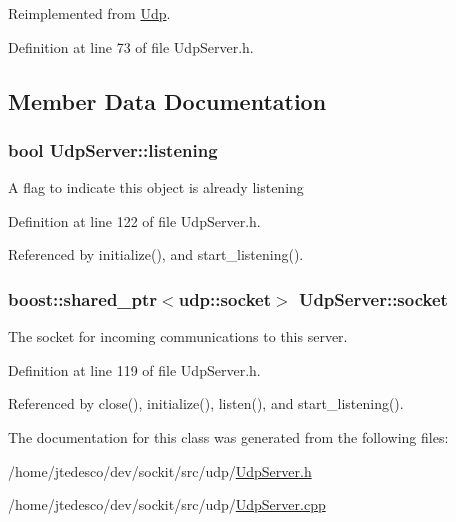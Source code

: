 Reimplemented from \hyperlink{classUdp_aa3db591e179836aff8d4a6d952d43101}{Udp}.



Definition at line 73 of file UdpServer.h.



\subsection{Member Data Documentation}
\hypertarget{classUdpServer_a57c16849cfe745828a022aa7346d40d7}{
\subsubsection[{listening}]{\setlength{\rightskip}{0pt plus 5cm}bool {\bf UdpServer::listening}}}
\label{classUdpServer_a57c16849cfe745828a022aa7346d40d7}
A flag to indicate this object is already listening 

Definition at line 122 of file UdpServer.h.



Referenced by initialize(), and start\_\-listening().

\hypertarget{classUdpServer_a0d49aeb5d5e8291f45487c1d2d082cee}{
\subsubsection[{socket}]{\setlength{\rightskip}{0pt plus 5cm}boost::shared\_\-ptr$<$udp::socket$>$ {\bf UdpServer::socket}}}
\label{classUdpServer_a0d49aeb5d5e8291f45487c1d2d082cee}
The socket for incoming communications to this server. 

Definition at line 119 of file UdpServer.h.



Referenced by close(), initialize(), listen(), and start\_\-listening().



The documentation for this class was generated from the following files:\begin{DoxyCompactItemize}
\item 
/home/jtedesco/dev/sockit/src/udp/\hyperlink{UdpServer_8h}{UdpServer.h}\item 
/home/jtedesco/dev/sockit/src/udp/\hyperlink{UdpServer_8cpp}{UdpServer.cpp}\end{DoxyCompactItemize}
